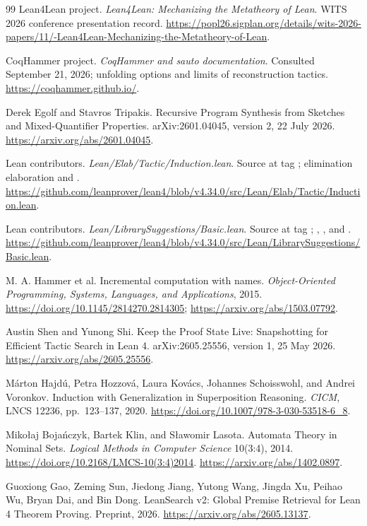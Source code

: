 \begin{thebibliography}{99}
 Lean4Lean project. \emph{Lean4Lean: Mechanizing the Metatheory of Lean}.
WITS 2026 conference presentation record.
\url{https://popl26.sigplan.org/details/wits-2026-papers/11/-Lean4Lean-Mechanizing-the-Metatheory-of-Lean}.

 CoqHammer project.
\emph{CoqHammer and sauto documentation}.
Consulted September 21, 2026; unfolding options and limits of reconstruction tactics.
\url{https://coqhammer.github.io/}.

 Derek Egolf and Stavros Tripakis.
Recursive Program Synthesis from Sketches and Mixed-Quantifier Properties.
arXiv:2601.04045, version 2, 22 July 2026.
\url{https://arxiv.org/abs/2601.04045}.

 Lean contributors.
\emph{Lean/Elab/Tactic/Induction.lean}.
Source at tag ; elimination elaboration and .
\url{https://github.com/leanprover/lean4/blob/v4.34.0/src/Lean/Elab/Tactic/Induction.lean}.

 Lean contributors.
\emph{Lean/LibrarySuggestions/Basic.lean}.
Source at tag ; , , and .
\url{https://github.com/leanprover/lean4/blob/v4.34.0/src/Lean/LibrarySuggestions/Basic.lean}.

 M. A. Hammer et al.
Incremental computation with names.
\emph{Object-Oriented Programming, Systems, Languages, and Applications}, 2015.
\url{https://doi.org/10.1145/2814270.2814305};
\url{https://arxiv.org/abs/1503.07792}.

 Austin Shen and Yunong Shi.
Keep the Proof State Live: Snapshotting for Efficient Tactic Search in Lean 4.
arXiv:2605.25556, version 1, 25 May 2026.
\url{https://arxiv.org/abs/2605.25556}.

 M{\'a}rton Hajd{\'u}, Petra Hozzov{\'a},
Laura Kov{\'a}cs, Johannes Schoisswohl, and Andrei Voronkov.
Induction with Generalization in Superposition Reasoning.
\emph{CICM}, LNCS 12236, pp.~123--137, 2020.
\url{https://doi.org/10.1007/978-3-030-53518-6_8}.

 Miko{\l}aj Boja{\'n}czyk, Bartek Klin, and S{\l}awomir Lasota.
Automata Theory in Nominal Sets.
\emph{Logical Methods in Computer Science} 10(3:4), 2014.
\url{https://doi.org/10.2168/LMCS-10(3:4)2014}.
\url{https://arxiv.org/abs/1402.0897}.

 Guoxiong Gao, Zeming Sun, Jiedong Jiang, Yutong Wang,
Jingda Xu, Peihao Wu, Bryan Dai, and Bin Dong.
LeanSearch v2: Global Premise Retrieval for Lean 4 Theorem Proving.
Preprint, 2026.
\url{https://arxiv.org/abs/2605.13137}.


\end{thebibliography}
